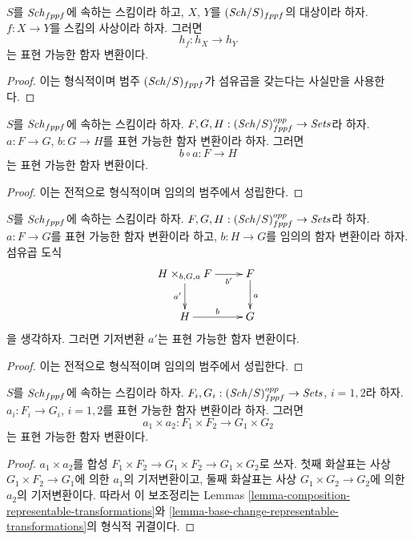 \begin{lemma}
\label{lemma-morphism-schemes-gives-representable-transformation}
$S$를 $\mathit{Sch}_{fppf}$에 속하는 스킴이라 하고,
$X$, $Y$를 $(\mathit{Sch}/S)_{fppf}$의 대상이라 하자.
$f : X \to Y$를 스킴의 사상이라 하자. 그러면
$$
h_f : h_X \longrightarrow h_Y
$$
는 표현 가능한 함자 변환이다.
\end{lemma}

\begin{proof}
이는 형식적이며 범주 $(\mathit{Sch}/S)_{fppf}$가 섬유곱을 갖는다는 사실만을
사용한다.
\end{proof}

\begin{lemma}
\label{lemma-composition-representable-transformations}
$S$를 $\mathit{Sch}_{fppf}$에 속하는 스킴이라 하자.
$F, G, H : (\mathit{Sch}/S)_{fppf}^{opp} \to \textit{Sets}$라 하자.
$a : F \to G$, $b : G \to H$를 표현 가능한 함자 변환이라 하자. 그러면
$$
b \circ a : F \longrightarrow H
$$
는 표현 가능한 함자 변환이다.
\end{lemma}

\begin{proof}
이는 전적으로 형식적이며 임의의 범주에서 성립한다.
\end{proof}

\begin{lemma}
\label{lemma-base-change-representable-transformations}
$S$를 $\mathit{Sch}_{fppf}$에 속하는 스킴이라 하자.
$F, G, H : (\mathit{Sch}/S)_{fppf}^{opp} \to \textit{Sets}$라 하자.
$a : F \to G$를 표현 가능한 함자 변환이라 하고,
$b : H \to G$를 임의의 함자 변환이라 하자. 섬유곱 도식
$$
\xymatrix{
H \times_{b, G, a} F \ar[r]_-{b'} \ar[d]_{a'} & F \ar[d]^a \\
H \ar[r]^b & G
}
$$
을 생각하자. 그러면 기저변환 $a'$는 표현 가능한 함자 변환이다.
\end{lemma}

\begin{proof}
이는 전적으로 형식적이며 임의의 범주에서 성립한다.
\end{proof}

\begin{lemma}
\label{lemma-product-representable-transformations}
$S$를 $\mathit{Sch}_{fppf}$에 속하는 스킴이라 하자.
$F_i, G_i : (\mathit{Sch}/S)_{fppf}^{opp} \to \textit{Sets}$, $i = 1, 2$라 하자.
$a_i : F_i \to G_i$, $i = 1, 2$를 표현 가능한 함자 변환이라 하자.
그러면
$$
a_1 \times a_2 : F_1 \times F_2 \longrightarrow G_1 \times G_2
$$
는 표현 가능한 함자 변환이다.
\end{lemma}

\begin{proof}
$a_1 \times a_2$를 합성
$F_1 \times F_2 \to G_1 \times F_2 \to G_1 \times G_2$로 쓰자.
첫째 화살표는 사상 $G_1 \times F_2 \to G_1$에 의한 $a_1$의
기저변환이고, 둘째 화살표는 사상 $G_1 \times G_2 \to G_2$에 의한
$a_2$의 기저변환이다. 따라서 이 보조정리는 Lemmas
\ref{lemma-composition-representable-transformations}와
\ref{lemma-base-change-representable-transformations}의 형식적 귀결이다.
\end{proof}

